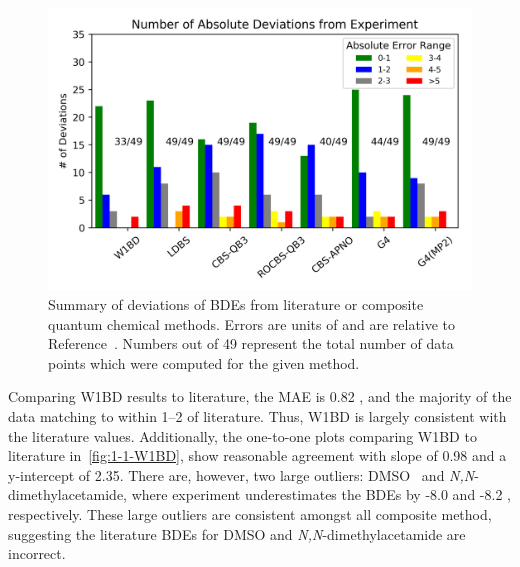 \begin{figure}[!htbp]
  \centering
  \includegraphics[width=\textwidth]{figures/bde-barchart}
  \caption[Summary of deviations of BDEs from literature for composite quantum chemical methods.]{Summary of deviations of BDEs from literature or composite quantum chemical methods. Errors are units of \kcalmol and are relative to Reference~\protect{}. Numbers out of 49 represent the total number of data points which were computed for the given method.}
  \label{fig:maebarchart}
\end{figure}

Comparing W1BD results to literature, the MAE is 0.82 \kcalmol, and the majority of the data matching to within 1--2 \kcalmol of literature. Thus, W1BD is largely consistent with the literature values. Additionally, the one-to-one plots comparing W1BD to literature in~\ref{fig:1-1-W1BD}, show reasonable agreement with slope of 0.98 and a y-intercept of 2.35. There are, however, two large outliers: DMSO\footnotemark~ and \emph{N,N}-dimethylacetamide, where experiment underestimates the BDEs by -8.0 and -8.2 \kcalmol, respectively. These large outliers are consistent amongst all composite method, suggesting the literature BDEs for DMSO and \emph{N,N}-dimethylacetamide are incorrect.



